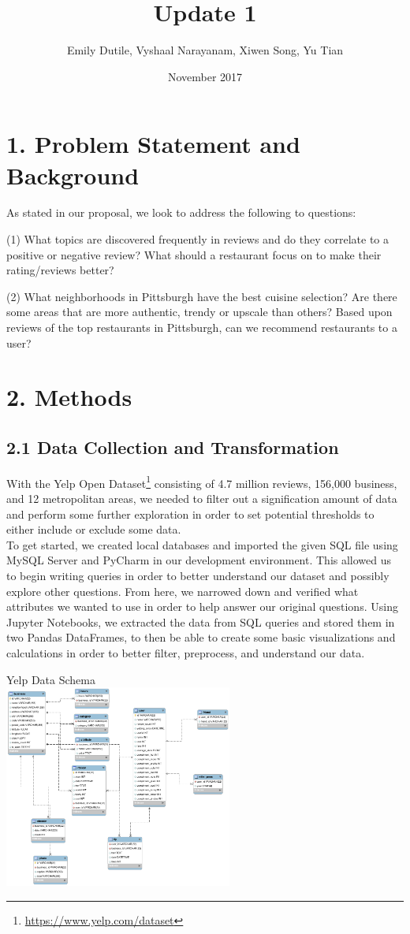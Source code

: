 \documentclass{neu_handout}
\title{Update 1}
\author{Emily Dutile, Vyshaal Narayanam, Xiwen Song, Yu Tian}
\date{November 2017}
\begin{document}
\section*{1. Problem Statement and Background}
As stated in our proposal, we look to address the following to questions:

(1) What topics are discovered frequently in reviews and do they correlate to a positive or negative review? What should a restaurant focus on to make their rating/reviews better?

(2) What neighborhoods in Pittsburgh have the best cuisine selection? Are there some areas that are more authentic, trendy or upscale than others? Based upon reviews of the top restaurants in Pittsburgh, can we recommend restaurants to a user?

\section*{2. Methods}

\subsection*{2.1 Data Collection and Transformation}
With the Yelp Open Dataset\footnote{\url{https://www.yelp.com/dataset}} consisting of 4.7 million reviews, 156,000 business, and 12 metropolitan areas, we needed to filter out a signification amount of data and perform some further exploration in order to set potential thresholds to either include or exclude some data.\\
To get started, we created local databases and imported the given SQL file using MySQL Server and PyCharm in our development environment. This allowed us to begin writing queries in order to better understand our dataset and possibly explore other questions. From here, we narrowed down and verified what attributes we wanted to use in order to help answer our original questions.  Using Jupyter Notebooks, we extracted the data from SQL queries and stored them in two Pandas DataFrames, to then be able to create some basic visualizations and calculations in order to better filter, preprocess, and understand our data.\\

\begin{center}
Yelp Data Schema\\
\includegraphics[width=75mm,scale=0.5]{schema}\\
\end{center}
\end{document}
